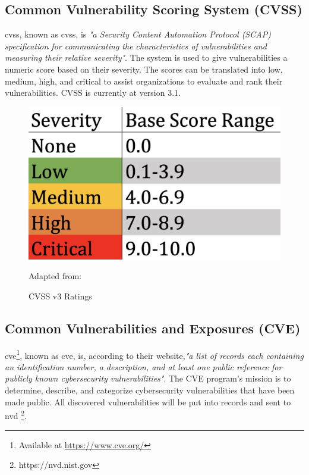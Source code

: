 \subsection{Common Vulnerability Scoring System (CVSS)}
\acrlong{cvss}, known as \acrshort{cvss}, is \textit{"a Security Content Automation Protocol (SCAP) specification for communicating the characteristics of vulnerabilities and measuring their relative severity"}\cite{nistCVSS}. The system is used to give vulnerabilities a numeric score based on their severity. The scores can be translated into low, medium, high, and critical to assist organizations to evaluate and rank their vulnerabilities. CVSS is currently at version 3.1. \cite{CVSS}
\begin{figure}[H]
    \centering
    \includegraphics[scale=0.3]{Images/CVSS.png}
    \caption{CVSS v3 Ratings} Adapted from:\cite{cvssrating}
    \label{fig:CVSS v3 Ratings}
\end{figure}


\subsection{Common Vulnerabilities and Exposures (CVE)}
\label{Common Vulnerabilities and Exposures}
\acrlong{cve}\footnote{Available at \url{https://www.cve.org/}}, known as \acrshort{cve}, is, according to their website,\textit{"a list of records each containing an identification number, a description, and at least one public reference for publicly known cybersecurity vulnerabilities"}\cite{CVE}. The CVE program's mission is to determine, describe, and categorize cybersecurity vulnerabilities that have been made public. All discovered vulnerabilities will be put into records and sent to \acrlong{nvd} \footnote{https://nvd.nist.gov}.

